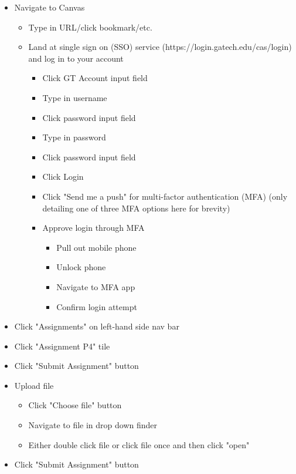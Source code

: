 \begin{itemize}
\item
  Navigate to Canvas
  \begin{itemize}
  \item
    Type in URL/click bookmark/etc.
  \item
    Land at single sign on (SSO) service (https://login.gatech.edu/cas/login) and log in to your account
    \begin{itemize}
    \item
      Click GT Account input field
    \item
      Type in username
    \item
      Click password input field
    \item
      Type in password
    \item
      Click password input field
    \item
      Click Login
    \item
      Click "Send me a push" for multi-factor authentication (MFA) (only detailing one of three MFA options here for brevity)
    \item
      Approve login through MFA
      \begin{itemize}
      \item
        Pull out mobile phone
      \item
        Unlock phone
      \item
        Navigate to MFA app
      \item
        Confirm login attempt
      \end{itemize}
    \end{itemize}
  \end{itemize}
\item
  Click "Assignments" on left-hand side nav bar
\item
  Click "Assignment P4" tile
\item
  Click "Submit Assignment" button
\item
  Upload file
  \begin{itemize}
  \item
    Click "Choose file" button
  \item
    Navigate to file in drop down finder
  \item
    Either double click file or click file once and then click "open"
  \end{itemize}
\item
  Click "Submit Assignment" button
\end{itemize}

